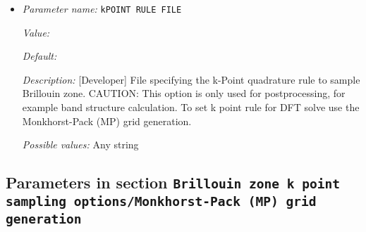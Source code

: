 \begin{itemize}
{\it Description:} [Standard] Flag to control usage of time reversal symmetry.


{\it Possible values:} A boolean value (true or false)
\item {\it Parameter name:} {\tt kPOINT RULE FILE}
\label{parameters:Brillouin zone k point sampling options/kPOINT RULE FILE}
\label{parameters:Brillouin_20zone_20k_20point_20sampling_20options/kPOINT_20RULE_20FILE}


{\it Value:} 


{\it Default:} 


{\it Description:} [Developer] File specifying the k-Point quadrature rule to sample Brillouin zone. CAUTION: This option is only used for postprocessing, for example band structure calculation. To set k point rule for DFT solve use the Monkhorst-Pack (MP) grid generation.


{\it Possible values:} Any string
\end{itemize}



\subsection{Parameters in section \tt Brillouin zone k point sampling options/Monkhorst-Pack (MP) grid generation}
\label{parameters:Brillouin_20zone_20k_20point_20sampling_20options/Monkhorst_2dPack_20_28MP_29_20grid_20generation}


